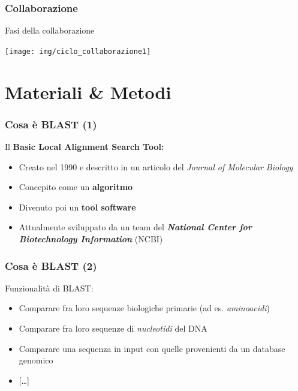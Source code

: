 \begin{frame}\frametitle{Collaborazione}

\begin{center}
\Large{Fasi della collaborazione}
\end{center}

\vspace{.5cm}

\begin{center}
    \texttt{[image: img/ciclo\_collaborazione1]}
\end{center}

\end{frame}

\section{Materiali \& Metodi}

\begin{frame}\frametitle{Cosa è BLAST (1)}

\Large

Il
\textbf{\alert{B}asic \alert{L}ocal \alert{A}lignment \alert{S}earch \alert{T}ool:}

\begin{itemize}[<+->]
\itemsep1pt\parskip0pt
\item
  Creato nel 1990 e descritto in un articolo del \emph{Journal of
  Molecular Biology}
\item
  Concepito come un \textbf{algoritmo}
\item
  Divenuto poi un \textbf{tool software}
\item
  Attualmente sviluppato da un team del \emph{\textbf{National Center
  for Biotechnology Information}} (NCBI)
\end{itemize}

\end{frame}

\begin{frame}\frametitle{Cosa è BLAST (2)}

\Large{Funzionalità di BLAST:}

\begin{itemize}[<+->]
\itemsep1pt\parskip0pt
\item
  Comparare fra loro sequenze biologiche primarie (ad es.
  \emph{aminoacidi})
\item
  Comparare fra loro sequenze di \emph{nucleotidi} del DNA
\item
  Comparare una sequenza in input con quelle provenienti da un database
  genomico
\item
  {[}\ldots{]}
\end{itemize}

\end{frame}

